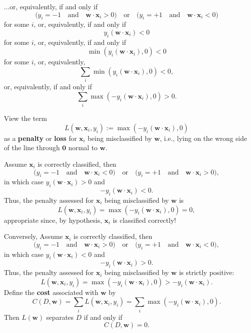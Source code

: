 \documentclass{beamer}
\newcommand{\vw}{\boldsymbol{w}}
\newcommand{\vx}{\boldsymbol{x}}
\newcommand{\vzero}{\boldsymbol{0}}
\begin{document}
\begin{frame}{}

    ...or, equivalently, if and only if
    \[
        \Big(y_i = -1\quad\text{and}\quad \vw\cdot\vx_i >0\Big)
        \quad\text{or}\quad
        \Big(y_i = +1\quad\text{and}\quad \vw\cdot\vx_i <0\Big)
    \]
    for some $i$, or, equivalently, if and only if
    \[
        y_i (\vw\cdot\vx_i) <0
    \]
    for some $i$, or, equivalently, if and only if
    \[
        \min(y_i (\vw\cdot\vx_i), 0) < 0
    \]
    for some $i$, or, equivalently,
    \[
        \sum_i\min(y_i (\vw\cdot\vx_i), 0) < 0,
    \]
    or, equivalently, if and only if
    \[
        \sum_i\max(-y_i (\vw\cdot\vx_i), 0) > 0.
    \]
\end{frame}

\begin{frame}
    View the term
    \[
        L(\vw, \vx_i, y_i) :=\max(-y_i(\vw\cdot\vx_i), 0)
    \]
    as a \textbf{penalty} or \textbf{loss} for $\vx_i$ being misclassified by $\vw$,
    i.e., lying on the wrong side of the line through $\vzero$ normal to $\vw$.

    Assume $\vx_i$ is correctly classified, then
    \[
        \Big(y_i = -1\quad\text{and}\quad \vw\cdot\vx_i <0\Big)
        \quad\text{or}\quad
        \Big(y_i = +1\quad\text{and}\quad \vw\cdot\vx_i >0\Big),
    \]
    in which case $y_i(\vw\cdot\vx_i)>0$ and
    \[
         -y_i(\vw\cdot\vx_i) < 0.
    \]
    Thus, the penalty assessed for $\vx_i$ being misclassified by $\vw$
    is
    \[
        L(\vw, \vx_i, y_i) = \max(-y_i(\vw\cdot\vx_i), 0) = 0,
    \]
    appropriate since, by hypothesis, $\vx_i$ is classified correctly!
\end{frame}

\begin{frame}{}
    Conversely, Assume $\vx_i$ is correctly classified, then
    \[
        \Big(y_i = -1\quad\text{and}\quad \vw\cdot\vx_i >0\Big)
        \quad\text{or}\quad
        \Big(y_i = +1\quad\text{and}\quad \vw\cdot\vx_i <0\Big),
    \]
    in which case $y_i(\vw\cdot\vx_i)<0$ and
    \[
         -y_i(\vw\cdot\vx_i) > 0.
    \]
    Thus, the penalty assessed for $\vx_i$ being misclassified by $\vw$
    is strictly positive:
    \[
        L(\vw, \vx_i, y_i) = \max(-y_i(\vw\cdot\vx_i), 0) > -y_i(\vw\cdot\vx_i).
    \]
    Define the \textbf{cost} associated with $\vw$ by
    \[
        C(D, \vw) = \sum_i L(\vw, \vx_i, y_i)
        = \sum_i \max(-y_i(\vw\cdot\vx_i), 0).
    \]
    Then $L(\vw)$ separates $D$ if and only if \[C(D, \vw)=0.\]
\end{frame}
\end{document}
